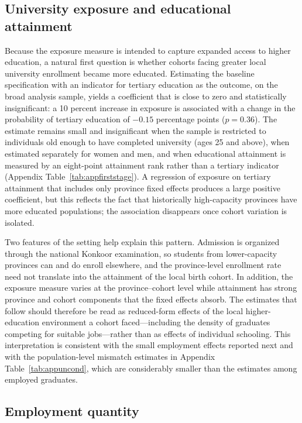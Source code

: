 \subsection{University exposure and educational attainment}
\label{sec:firststage}

Because the exposure measure is intended to capture expanded access to higher education, a natural first question is whether cohorts facing greater local university enrollment became more educated. Estimating the baseline specification with an indicator for tertiary education as the outcome, on the broad analysis sample, yields a coefficient that is close to zero and statistically insignificant: a 10 percent increase in exposure is associated with a change in the probability of tertiary education of $-0.15$ percentage points ($p=0.36$). The estimate remains small and insignificant when the sample is restricted to individuals old enough to have completed university (ages 25 and above), when estimated separately for women and men, and when educational attainment is measured by an eight-point attainment rank rather than a tertiary indicator (Appendix Table~\ref{tab:appfirststage}). A regression of exposure on tertiary attainment that includes only province fixed effects produces a large positive coefficient, but this reflects the fact that historically high-capacity provinces have more educated populations; the association disappears once cohort variation is isolated.

Two features of the setting help explain this pattern. Admission is organized through the national Konkoor examination, so students from lower-capacity provinces can and do enroll elsewhere, and the province-level enrollment rate need not translate into the attainment of the local birth cohort. In addition, the exposure measure varies at the province--cohort level while attainment has strong province and cohort components that the fixed effects absorb. The estimates that follow should therefore be read as reduced-form effects of the local higher-education environment a cohort faced---including the density of graduates competing for suitable jobs---rather than as effects of individual schooling. This interpretation is consistent with the small employment effects reported next and with the population-level mismatch estimates in Appendix Table~\ref{tab:appuncond}, which are considerably smaller than the estimates among employed graduates.

\subsection{Employment quantity}

